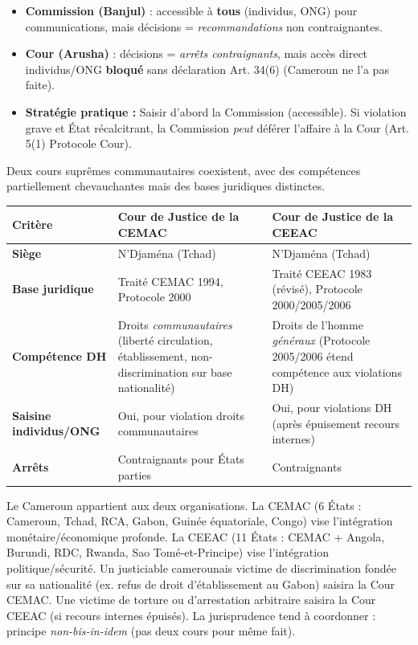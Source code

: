 \documentclass[11pt]{article}
\newcounter{popsec}
\newcounter{popsub}
\newcommand{\courssub}[1]{%
  \stepcounter{popsub}%
  \par\vspace{9pt}\noindent{\popxbold\fontsize{11.5}{13}\selectfont\color{popink}{\color{poporange}\thepopsec.\thepopsub}\hspace{6pt}#1}\par\nopagebreak\vspace{4pt}
}
\begin{document}
\begin{attention}
\begin{itemize}
  \item \textbf{Commission (Banjul)} : accessible à \textbf{tous} (individus, ONG) pour communications, mais décisions = \emph{recommandations} non contraignantes.
  \item \textbf{Cour (Arusha)} : décisions = \emph{arrêts contraignants}, mais accès direct individus/ONG \textbf{bloqué} sans déclaration Art. 34(6) (Cameroun ne l'a pas faite).
  \item \textbf{Stratégie pratique :} Saisir d'abord la Commission (accessible). Si violation grave et État récalcitrant, la Commission \emph{peut} déférer l'affaire à la Cour (Art. 5(1) Protocole Cour).
\end{itemize}
\end{attention}

\courssub{Niveau sous-régional : CEMAC et CEEAC}

Deux cours suprêmes communautaires coexistent, avec des compétences partiellement chevauchantes mais des bases juridiques distinctes.

\begin{center}
\begin{tabularx}{\linewidth}{|l|X|X|}
\hline
\rowcolor{popblueL}
\textbf{Critère} & \textbf{Cour de Justice de la CEMAC} & \textbf{Cour de Justice de la CEEAC} \\
\hline
\textbf{Siège} & N'Djaména (Tchad) & N'Djaména (Tchad) \\
\hline
\textbf{Base juridique} & Traité CEMAC 1994, Protocole 2000 & Traité CEEAC 1983 (révisé), Protocole 2000/2005/2006 \\
\hline
\textbf{Compétence DH} & Droits \emph{communautaires} (liberté circulation, établissement, non-discrimination sur base nationalité) & Droits de l'homme \emph{généraux} (Protocole 2005/2006 étend compétence aux violations DH) \\
\hline
\textbf{Saisine individus/ONG} & Oui, pour violation droits communautaires & Oui, pour violations DH (après épuisement recours internes) \\
\hline
\textbf{Arrêts} & Contraignants pour États parties & Contraignants \\
\hline
\end{tabularx}
\end{center}

\begin{savaistu}
Le Cameroun appartient aux deux organisations. La CEMAC (6 États : Cameroun, Tchad, RCA, Gabon, Guinée équatoriale, Congo) vise l'intégration monétaire/économique profonde. La CEEAC (11 États : CEMAC + Angola, Burundi, RDC, Rwanda, Sao Tomé-et-Principe) vise l'intégration politique/sécurité. Un justiciable camerounais victime de discrimination fondée sur sa nationalité (ex. refus de droit d'établissement au Gabon) saisira la Cour CEMAC. Une victime de torture ou d'arrestation arbitraire saisira la Cour CEEAC (si recours internes épuisés). La jurisprudence tend à coordonner : principe \emph{non-bis-in-idem} (pas deux cours pour même fait).
\end{savaistu}
\end{document}

